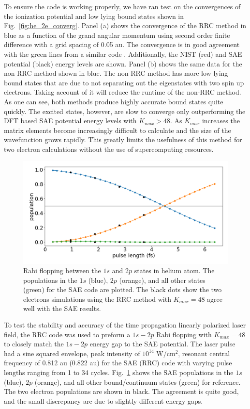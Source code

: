 To ensure the code is working properly, we have ran test on the convergences of the ionization potential and low lying bound states shown in Fig.~\ref{fig:he_2e_converg}. Panel (a) shows the convergence of the RRC method in blue as a function of the grand angular momentum using second order finite difference with a grid spacing of 0.05 au. The convergence is in good agreement with the green lines from a similar code \cite{khan2015}. Additionally, the NIST  (red) and SAE potential (black) energy levels are shown. Panel (b) shows the same data for the non-RRC method shown in blue. The non-RRC method has more low lying bound states that are due to not separating out the eigenstates with two spin up electrons. Taking account of it will reduce the runtime of the non-RRC method. As one can see, both methods produce highly accurate bound states quite quickly. The excited states, however, are slow to converge only outperforming the DFT based SAE potential energy levels with $K_{max} > 48$. As $K_{max}$ increases the matrix elements become increasingly difficult to calculate and the size of the wavefunction grows rapidly. This greatly limits the usefulness of this method for two electron calculations without the use of supercomputing resources.


\begin{figure}[!ht]
\centering
\includegraphics[width=\linewidth]{figs/Two_electron/1s-2p_rabi_flop_ee_sae.png}
\caption{Rabi flopping between the $1s$ and $2p$ states in helium atom. The populations in the $1s$ (blue), $2p$ (orange), and all other states (green) for the SAE code are plotted. The black dots show the two electrons simulations using the RRC method with $K_{max}=48$ agree well with the SAE results.
} 
  \label{fig:he_rabi_flop_ee}
\end{figure}

To test the stability and accuracy of the time propagation linearly polarized laser field, the RRC code was used to preform a $1s-2p$ Rabi flopping with $K_{max} = 48$ to closely match the $1s-2p$ energy gap to the SAE potential. The laser pulse had a sine squared envelope, peak intensity of $10^{14}$ W/cm$^2$, resonant central frequency of 0.812 au (0.822 au) for the SAE (RRC) code with varying pulse lengths ranging from 1 to 34 cycles. Fig.~\ref{fig:he_rabi_flop_ee} shows the SAE populations in the $1s$ (blue), $2p$ (orange), and all other bound/continuum states (green) for reference. The two electron populations are shown in black. The agreement is quite good, and the small discrepancy are due to slightly different energy gaps.

